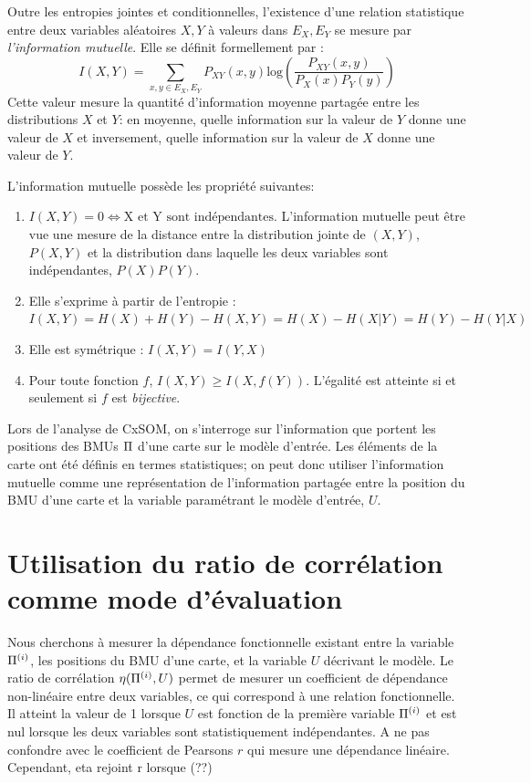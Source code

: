 \documentclass[../main]{subfiles}
\begin{document}
Outre les entropies jointes et conditionnelles, l'existence d'une relation statistique entre deux variables aléatoires $X,Y$ à valeurs dans $E_X,E_Y$ se mesure par \emph{l'information mutuelle}. Elle se définit formellement par : 
\begin{equation}
 I(X,Y) = \sum_{x,y \in E_X,E_Y}{P_{XY}(x,y)\textrm{log}(\frac{P_{XY}(x,y)}{P_X(x)P_Y(y)})}
\end{equation}
Cette valeur mesure la quantité d'information moyenne partagée entre les distributions $X$ et $Y$: en moyenne, quelle information sur la valeur de $Y$ donne une valeur de $X$ et inversement, quelle information sur la valeur de $X$ donne une valeur de $Y$.

L'information mutuelle possède les propriété suivantes:
\begin{enumerate}
\item $I(X,Y) = 0 \Leftrightarrow \textrm{X et Y sont indépendantes}$. L'information mutuelle peut être vue une mesure de la distance entre la distribution jointe de $(X,Y)$, $P(X,Y)$ et la distribution dans laquelle les deux variables sont indépendantes, $P(X)P(Y)$.
\item Elle s'exprime à partir de l'entropie : $I(X,Y) = H(X) + H(Y) - H(X,Y) = H(X) - H(X|Y) = H(Y) - H(Y|X)$
\item Elle est symétrique : $I(X,Y) = I(Y,X)$
\item Pour toute fonction $f$, $I(X,Y) \geq I(X,f(Y))$. L'égalité est atteinte si et seulement si $f$ est \emph{bijective}.
\end{enumerate}

Lors de l'analyse de CxSOM, on s'interroge sur l'information que portent les positions des BMUs $\Pi$ d'une carte sur le modèle d'entrée.
Les éléments de la carte ont été définis en termes statistiques; on peut donc utiliser l'information mutuelle comme une représentation de l'information partagée entre la position du BMU d'une carte et la variable paramétrant le modèle d'entrée, $U$.


\section{Utilisation du ratio de corrélation comme mode d'évaluation}

Nous cherchons à mesurer la dépendance fonctionnelle existant entre la variable $\Pi^{({i})}$, les positions du BMU d'une carte, et la variable $U$ décrivant le modèle.
Le ratio de corrélation $\eta(\Pi^{({i})},U)$ permet de mesurer un coefficient de dépendance non-linéaire entre deux variables, ce qui correspond à une relation fonctionnelle. Il atteint la valeur de 1 lorsque $U$ est fonction de la première variable $\Pi^{({i})}$ et est nul lorsque les deux variables sont statistiquement indépendantes.
A ne pas confondre avec le coefficient de Pearsons $r$ qui mesure une dépendance linéaire. Cependant, eta rejoint r lorsque (??)
\end{document}
